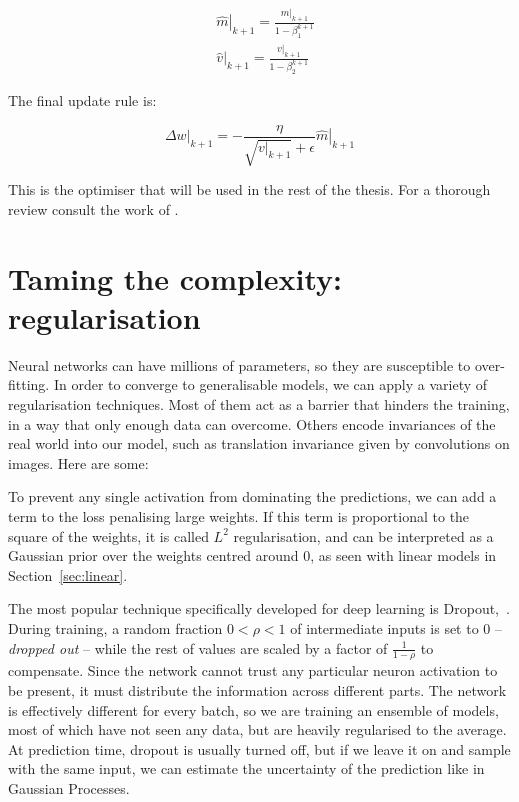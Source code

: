 \begin{align*}
	&\left.\hat{m}\right|_{k+1} = \frac{\left.m\right|_{k+1}}{1-\beta_1^{k+1}}\\
	&\left.\hat{v}\right|_{k+1} = \frac{\left.v\right|_{k+1}}{1-\beta_2^{k+1}}
\end{align*}

The final update rule is:

\begin{equation*}
\left.\Delta w\right|_{k+1} = - \frac{\eta}{\sqrt{\left.v\right|_{k+1}} + \epsilon}\left.\hat{m}\right|_{k+1}
\end{equation*} 

This is the optimiser that will be used in the rest of the thesis.
For a thorough review consult the work of \citet{optimisers_review}.


\section{Taming the complexity: regularisation}
Neural networks can have millions of parameters, so they are susceptible to over-fitting.
In order to converge to generalisable models, we can apply a variety of regularisation techniques.
Most of them act as a barrier that hinders the training, in a way that only enough data can overcome.
Others encode invariances of the real world into our model, such as translation invariance given by convolutions on images.
Here are some:


To prevent any single activation from 
dominating the predictions, we can add a term to the loss penalising large weights.
If this term is proportional to the square of the weights, it is called $L^2$ regularisation, and can be interpreted as a Gaussian prior over the weights centred around $0$, as seen with linear models in Section~\ref{sec:linear}.

The most popular technique  
specifically developed for deep learning is Dropout,~\citep{dropout}. 
During training, a random fraction $0 < \rho < 1$ of intermediate inputs is set to $0$ -- \emph{dropped out} --  while the rest of values are scaled by a factor of $\frac{1}{1-\rho}$ to compensate.
Since the network cannot trust any particular neuron activation to be present, it must distribute the information across different parts.
The network is effectively different for every batch, so we are training an ensemble of models, most of which have not seen any data, but are heavily regularised to the average.
At prediction time, dropout is usually turned off, but if we leave it on and sample with the same input, we can estimate the uncertainty of the prediction like in Gaussian Processes.

